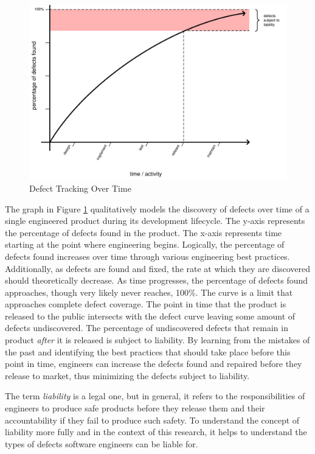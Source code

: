 \documentclass[12pt]{report}
\begin{document}
\begin{figure}[t]  
\begin{center}  
\includegraphics[scale=0.77]{figures/graph.pdf}  
\end{center}  
\caption{Defect Tracking Over Time}  
\label{fig:bugs}  
\end{figure}  

The graph in Figure \ref{fig:bugs} qualitatively models the discovery of defects over time of a single engineered product during its development lifecycle. The y-axis represents the percentage of defects found in the product. The x-axis represents time starting at the point where engineering begins. Logically, the percentage of defects found increases over time through various engineering best practices. Additionally, as defects are found and fixed, the rate at which they are discovered should theoretically decrease. As time progresses, the percentage of defects found approaches, though very likely never reaches, 100\%. The curve is a limit that approaches complete defect coverage. The point in time that the product is released to the public intersects with the defect curve leaving some amount of defects undiscovered. The percentage of undiscovered defects that remain in product \textit{after} it is released is subject to liability. By learning from the mistakes of the past and identifying the best practices that should take place before this point in time, engineers can increase the defects found and repaired before they release to market, thus minimizing the defects subject to liability. 

The term \textit{liability} is a legal one, but in general, it refers to the responsibilities of engineers to produce safe products before they release them and their accountability if they fail to produce such safety. To understand the concept of liability more fully and in the context of this research, it helps to understand the types of defects software engineers can be liable for.
\end{document}
